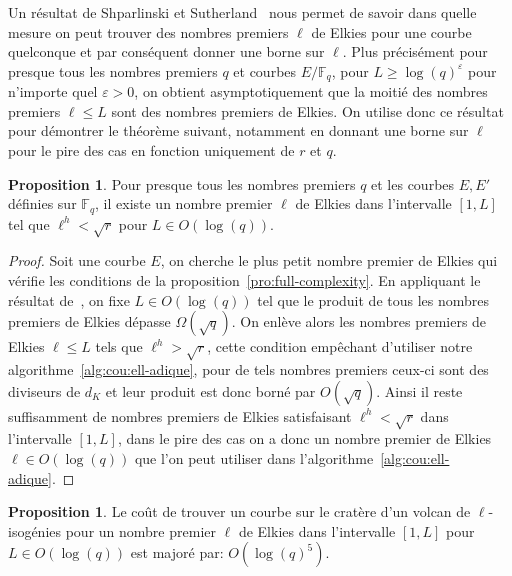 \documentclass[10pt,a4paper]{book}
\theoremstyle{plain}
\theoremstyle{definition}
\theoremstyle{definition}
\theoremstyle{definition}
\newtheorem{prop}[thm]{Proposition}
\theoremstyle{definition}
\theoremstyle{remark}
\theoremstyle{remark}
\theoremstyle{definition}
\begin{document}
Un résultat de Shparlinski et 
Sutherland~\cite[Theorem~1]{ShparlinskiSutherland14}
nous permet de savoir dans quelle mesure on peut trouver des nombres premiers 
$\ell$ de Elkies pour une courbe quelconque et par conséquent donner une borne sur
 $\ell$. Plus précisément pour presque 
tous les nombres premiers $q$ et courbes $E/\mathbb{F}_q$, pour 
$L\geqslant\log(q)^\varepsilon$ pour n'importe quel $\varepsilon>0$,
on obtient asymptotiquement que la moitié des nombres premiers $\ell \leqslant 
L$ sont des nombres premiers de Elkies.
On utilise donc ce résultat pour démontrer le théorème suivant, notamment en donnant une 
borne sur $\ell$ pour le pire des cas en fonction uniquement de $r$ et $q$.

\begin{prop}
\label{pro:bor:ell}
Pour presque tous les nombres premiers $q$ et les courbes $E,E'$ définies sur 
$\mathbb{F}_q$, il existe un nombre premier $\ell$ de Elkies 
dans l'intervalle $[1,L]$ tel que $\ell^h < \sqrt{r}$ pour $L \in O(\log(q))$.
\end{prop}

\begin{proof}
Soit une courbe $E$, on cherche le plus petit nombre premier de Elkies qui 
  vérifie les conditions de la proposition~\ref{pro:full-complexity}.
  En appliquant le résultat de~\cite[Theorem~1]{ShparlinskiSutherland14},
  on fixe $L \in O(\log(q))$ tel que le produit de tous les nombres premiers 
  de Elkies dépasse $\Omega(\sqrt{q})$. On enlève alors les nombres premiers 
  de Elkies $\ell \leqslant L$ tels que $\ell^{h} > \sqrt{r}$, cette condition
  empêchant d'utiliser notre algorithme~\ref{alg:cou:ell-adique}, 
  pour de tels nombres premiers ceux-ci sont des diviseurs de $d_{K}$ et leur 
  produit est donc borné par $O(\sqrt{q})$. Ainsi il reste suffisamment de 
  nombres premiers de Elkies satisfaisant $\ell^{h} < \sqrt{r}$ dans 
  l'intervalle  $[1,L]$, dans le pire des cas on a donc un nombre premier de
  Elkies $\ell \in O(\log(q))$ que l'on peut utiliser dans 
  l'algorithme~\ref{alg:cou:ell-adique}.
\end{proof}

\begin{prop}
\label{pro:cou:dec}
Le coût de trouver un courbe sur le cratère d'un volcan de $\ell$-isogénies 
pour un nombre premier $\ell$ de Elkies dans l'intervalle $[1,L]$ 
pour $L \in O(\log(q))$ est majoré par:
$O(\log(q)^5)$.
\end{prop}
\end{document}
